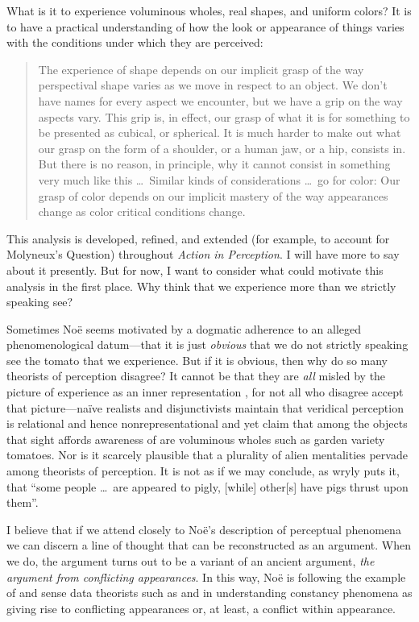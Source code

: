 \documentclass[12pt]{article}
\begin{document}
What is it to experience voluminous wholes, real shapes, and uniform colors? It is to have a practical understanding of how the look or appearance of things varies with the conditions under which they are perceived:
	\begin{quote}
		The experience of shape depends on our implicit grasp of the way perspectival shape varies as we move in respect to an object. We don’t have names for every aspect we encounter, but we have a grip on the way aspects vary. This grip is, in effect, our grasp of what it is for something to be presented as cubical, or spherical. It is much harder to make out what our grasp on the form of a shoulder, or a human jaw, or a hip, consists in. But there is no reason, in principle, why it cannot consist in something very much like this \ldots\ Similar kinds of considerations \ldots\ go for color: Our grasp of color depends on our implicit mastery of the way appearances change as color critical conditions change. \citep[198--199]{Noe:2004fk}
	\end{quote}
This analysis is developed, refined, and extended (for example, to account for Molyneux's Question) throughout \emph{Action in Perception}. I will have more to say about it presently. But for now, I want to consider what could motivate this analysis in the first place. Why think that we experience more than we strictly speaking see?

Sometimes Noë seems motivated by a dogmatic adherence to an alleged phenomenological datum---that it is just \emph{obvious} that we do not strictly speaking see the tomato that we experience. But if it is obvious, then why do so many theorists of perception disagree? It cannot be that they are \emph{all} misled by the picture of experience as an inner representation \citep[chapter 2]{Noe:2004fk}, for not all who disagree accept that picture---naïve realists and disjunctivists maintain that veridical perception is relational and hence nonrepresentational and yet claim that among the objects that sight affords awareness of are voluminous wholes such as garden variety tomatoes. Nor is it scarcely plausible that a plurality of alien mentalities pervade among theorists of perception. It is not as if we may conclude, as \citet[69]{Sartwell:1995ve} wryly puts it, that ``some people \ldots\ are appeared to pigly, [while] other[s] have pigs thrust upon them''. 

I believe that if we attend closely to Noë's description of perceptual phenomena we can discern a line of thought that can be reconstructed as an argument. When we do, the argument turns out to be a variant of an ancient argument, \emph{the argument from conflicting appearances}. In this way, Noë is following the example of \citet{Berkeley:1734fk} and sense data theorists such as \citet{Russell:1912uq} and \citet{Price:1932fk} in understanding constancy phenomena as giving rise to conflicting appearances or, at least, a conflict within appearance.
\end{document}

